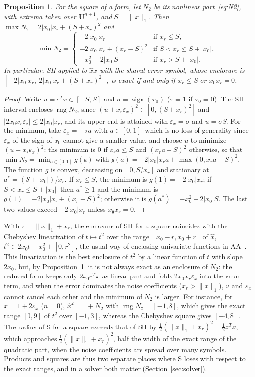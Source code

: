 \documentclass[10pt]{article}
\newtheorem{propo}{Proposition}
\theoremstyle{definition}
\newcommand{\U}{\mathbf{U}}
\newcommand{\eps}{\varepsilon}
\newcommand{\ex}{\eps_x}
\newcommand{\rng}{\operatorname{rng}}
\begin{document}
\begin{propo}
\label{prop:square}
For the square of a form, let $N_2$ be its nonlinear part~\eqref{eq:N2}, with extrema taken over $\U^{n+1}$, and $S=\|x\|_1$. Then $\max N_2=2|x_0|x_r+(S+x_r)^2$ and
\[
\min N_2=\begin{cases}-2|x_0|x_r & \text{if } x_r\le S,\\ -2|x_0|x_r+(x_r-S)^2 & \text{if } S<x_r\le S+|x_0|,\\ -x_0^2-2|x_0|S & \text{if } x_r>S+|x_0|.\end{cases}
\]
In particular, SH applied to $\hat x\hat x$ with the shared error symbol, whose enclosure is $[-2|x_0|x_r,\ 2|x_0|x_r+(S+x_r)^2]$, is exact if and only if $x_r\le S$ or $x_0x_r=0$.
\end{propo}
\begin{proof}
Write $u=e^Tx\in[-S,S]$ and $\sigma=\operatorname{sign}(x_0)$ ($\sigma=1$ if $x_0=0$). The SH interval encloses $\rng N_2$, since $(u+x_r\ex)^2\in[0,(S+x_r)^2]$ and $|2x_0x_r\ex|\le2|x_0|x_r$, and its upper end is attained with $\ex=\sigma$ and $u=\sigma S$. For the minimum, take $\ex=-\sigma a$ with $a\in[0,1]$, which is no loss of generality since $\ex$ of the sign of $x_0$ cannot give a smaller value, and choose $u$ to minimize $(u+x_r\ex)^2$: the minimum is $0$ if $x_ra\le S$ and $(x_ra-S)^2$ otherwise, so that $\min N_2=\min_{a\in[0,1]}g(a)$ with $g(a)=-2|x_0|x_ra+\max(0,x_ra-S)^2$. The function $g$ is convex, decreasing on $[0,S/x_r]$ and stationary at $a^*=(S+|x_0|)/x_r$. If $x_r\le S$, the minimum is $g(1)=-2|x_0|x_r$; if $S<x_r\le S+|x_0|$, then $a^*\ge1$ and the minimum is $g(1)=-2|x_0|x_r+(x_r-S)^2$; otherwise it is $g(a^*)=-x_0^2-2|x_0|S$. The last two values exceed $-2|x_0|x_r$ unless $x_0x_r=0$.
\end{proof}
With $r=\|x\|_1+x_r$, the enclosure of SH for a square coincides with the Chebyshev linearization of $t\mapsto t^2$ over the range $[x_0-r,x_0+r]$ of $\hat x$, $t^2\in 2x_0t-x_0^2+[0,r^2]$, the usual way of enclosing univariate functions in AA~\cite{stolfi1997self}. This linearization is the best enclosure of $t^2$ by a linear function of $t$ with slope $2x_0$, but, by Proposition~\ref{prop:square}, it is not always exact as an enclosure of $N_2$: the reduced form keeps only $2x_0e^Tx$ as linear part and folds $2x_0x_r\ex$ into the error term, and when the error dominates the noise coefficients ($x_r>\|x\|_1$), $u$ and $\ex$ cannot cancel each other and the minimum of $N_2$ is larger. For instance, for $\hat x=1+2\ex$ ($n=0$), $\hat x^2=1+N_2$ with $\rng N_2=[-1,8]$, which gives the exact range $[0,9]$ of $t^2$ over $[-1,3]$, whereas the Chebyshev square gives $[-4,8]$. The radius of S for a square exceeds that of SH by $\tfrac12(\|x\|_1+x_r)^2-\tfrac12x^Tx$, which approaches $\tfrac12(\|x\|_1+x_r)^2$, half the width of the exact range of the quadratic part, when the noise coefficients are spread over many symbols. Products and squares are thus two separate places where S loses with respect to the exact ranges, and in a solver both matter (Section~\ref{sec:solver}).
\end{document}
